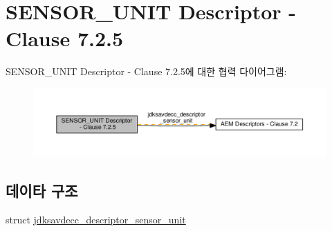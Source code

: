 \hypertarget{group__descriptor__sensor}{}\section{S\+E\+N\+S\+O\+R\+\_\+\+U\+N\+IT Descriptor -\/ Clause 7.2.5}
\label{group__descriptor__sensor}
S\+E\+N\+S\+O\+R\+\_\+\+U\+N\+IT Descriptor -\/ Clause 7.2.5에 대한 협력 다이어그램\+:
\nopagebreak
\begin{figure}[H]
\begin{center}
\leavevmode
\includegraphics[width=350pt]{group__descriptor__sensor}
\end{center}
\end{figure}
\subsection*{데이타 구조}
\begin{DoxyCompactItemize}
\item 
struct \hyperlink{structjdksavdecc__descriptor__sensor__unit}{jdksavdecc\+\_\+descriptor\+\_\+sensor\+\_\+unit}
\end{DoxyCompactItemize}
